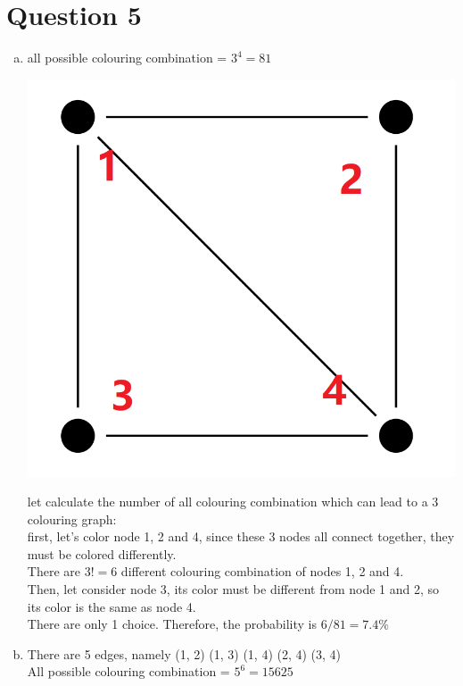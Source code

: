 \documentclass[11pt, a4paper]{article}
\begin{document}
\section*{Question 5}
\begin{enumerate}[(a)]
    \item
    all possible colouring combination = $ 3^4 = 81 $\\
        \begin{center}
            \includegraphics[scale=0.5]{location}
        \end{center}
    let calculate the number of all colouring combination which can lead to a 3 colouring graph:\\
    first, let's color node 1, 2 and 4, since these 3 nodes all connect together, they must be colored differently.\\
    There are $ 3! = 6 $ different colouring combination of nodes 1, 2 and 4.\\
    Then, let consider node 3, its color must be different from node 1 and 2, so its color is the same as node 4.\\
    There are only 1 choice.
    Therefore, the probability is $ 6/81 = 7.4\% $
    \item
    There are 5 edges, namely (1, 2) (1, 3) (1, 4) (2, 4) (3, 4)\\
    All possible colouring combination = $ 5^6 = 15625 $\\

\end{enumerate}
\end{document}

